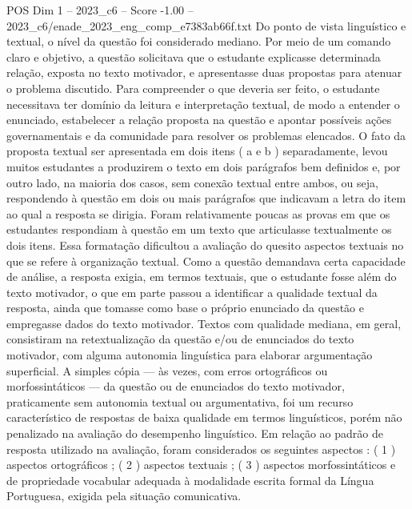 \begin{textsample}{POS Dim 1 – 2023\_c6 – Score -1.00 – 2023\_c6/enade\_2023\_eng\_comp\_e7383ab66f.txt}
Do ponto de vista linguístico e textual, o nível da questão foi considerado mediano.
Por meio de um comando claro e objetivo, a questão solicitava que o estudante explicasse determinada relação, exposta no texto motivador, e apresentasse duas propostas para atenuar o problema discutido.
Para compreender o que deveria ser feito, o estudante necessitava ter domínio da leitura e interpretação textual, de modo a entender o enunciado, estabelecer a relação proposta na questão e apontar possíveis ações governamentais e da comunidade para resolver os problemas elencados.
O fato da proposta textual ser apresentada em dois itens ( a e b ) separadamente, levou muitos estudantes a produzirem o texto em dois parágrafos bem definidos e, por outro lado, na maioria dos casos, sem conexão textual entre ambos, ou seja, respondendo à questão em dois ou mais parágrafos que indicavam a letra do item ao qual a resposta se dirigia.
Foram relativamente poucas as provas em que os estudantes respondiam à questão em um texto que articulasse textualmente os dois itens.
Essa formatação dificultou a avaliação do quesito aspectos textuais no que se refere à organização textual.
Como a questão demandava certa capacidade de análise, a resposta exigia, em termos textuais, que o estudante fosse além do texto motivador, o que em parte passou a identificar a qualidade textual da resposta, ainda que tomasse como base o próprio enunciado da questão e empregasse dados do texto motivador.
Textos com qualidade mediana, em geral, consistiram na retextualização da questão e/ou de enunciados do texto motivador, com alguma autonomia linguística para elaborar argumentação superficial.
A simples cópia — às vezes, com erros ortográficos ou morfossintáticos — da questão ou de enunciados do texto motivador, praticamente sem autonomia textual ou argumentativa, foi um recurso característico de respostas de baixa qualidade em termos linguísticos, porém não penalizado na avaliação do desempenho linguístico.
Em relação ao padrão de resposta utilizado na avaliação, foram considerados os seguintes aspectos : ( 1 ) aspectos ortográficos ; ( 2 ) aspectos textuais ; ( 3 ) aspectos morfossintáticos e de propriedade vocabular adequada à modalidade escrita formal da Língua Portuguesa, exigida pela situação comunicativa.

\end{textsample}
